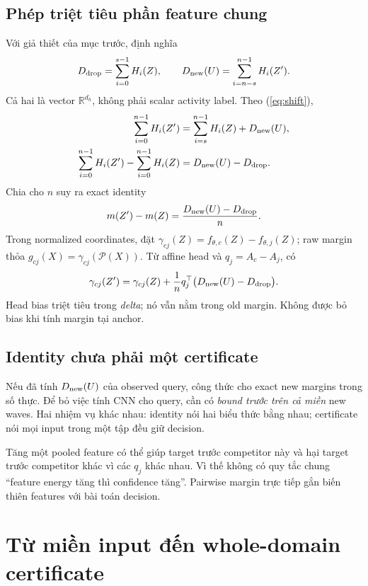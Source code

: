 \documentclass[11pt,a4paper]{article}
\newcommand{\R}{\mathbb R}
\theoremstyle{definition}
\begin{document}
\subsection{Phép triệt tiêu phần feature chung}
Với giả thiết của mục trước, định nghĩa
\begin{equation}
D_{\rm drop}=\sum_{i=0}^{s-1}H_i(Z),\qquad
D_{\rm new}(U)=\sum_{i=n-s}^{n-1}H_i(Z').
\end{equation}
Cả hai là vector $\R^{d_h}$, không phải scalar activity label. Theo
(\ref{eq:shift}),
\begin{align}
\sum_{i=0}^{n-1}H_i(Z')
&=\sum_{i=s}^{n-1}H_i(Z)+D_{\rm new}(U),\\
\sum_{i=0}^{n-1}H_i(Z')-\sum_{i=0}^{n-1}H_i(Z)
&=D_{\rm new}(U)-D_{\rm drop}.
\end{align}
Chia cho $n$ suy ra exact identity
\begin{equation}
m(Z')-m(Z)=\frac{D_{\rm new}(U)-D_{\rm drop}}n.
\label{eq:gapdelta}
\end{equation}
Trong normalized coordinates, đặt $\gamma_{cj}(Z)=f_{\theta,c}(Z)-f_{\theta,j}(Z)$;
raw margin thỏa $g_{cj}(X)=\gamma_{cj}(\mathcal P(X))$. Từ affine head và
$q_j=A_c-A_j$, có
\begin{equation}
\gamma_{cj}(Z')=\gamma_{cj}(Z)+\frac1nq_j^\top
\bigl(D_{\rm new}(U)-D_{\rm drop}\bigr).
\label{eq:margindelta}
\end{equation}
Head bias triệt tiêu trong \emph{delta}; nó vẫn nằm trong old margin.
Không được bỏ bias khi tính margin tại anchor.

\subsection{Identity chưa phải một certificate}
Nếu đã tính $D_{\rm new}(U)$ của observed query, công thức cho exact
new margins trong số thực. Để bỏ việc tính CNN cho query, cần có
\emph{bound trước trên cả miền} new waves. Hai nhiệm vụ khác nhau:
identity nói hai biểu thức bằng nhau; certificate nói mọi input trong
một tập đều giữ decision.

Tăng một pooled feature có thể giúp target trước competitor này và hại
target trước competitor khác vì các $q_j$ khác nhau. Vì thế không có
quy tắc chung ``feature energy tăng thì confidence tăng''. Pairwise
margin trực tiếp gắn biến thiên features với bài toán decision.

\section{Từ miền input đến whole-domain certificate}
\end{document}
